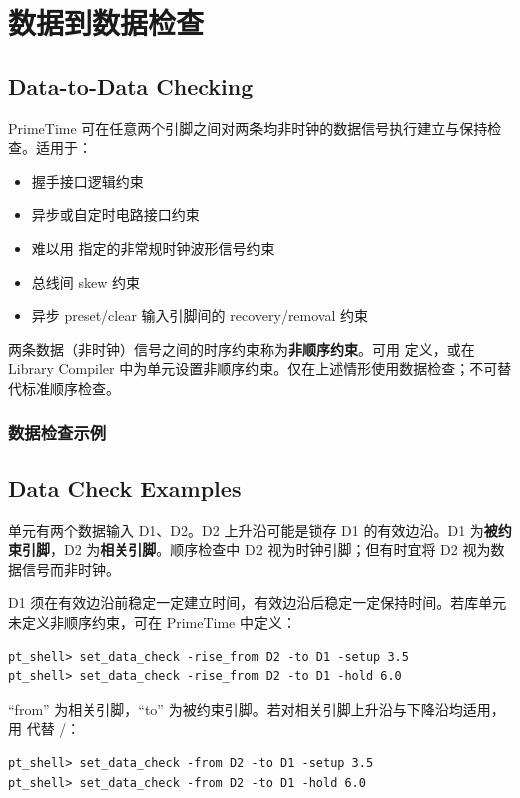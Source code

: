 \section{数据到数据检查}
\subsection*{Data-to-Data Checking}

PrimeTime 可在任意两个引脚之间对两条均非时钟的数据信号执行建立与保持检查。适用于：
\begin{itemize}
  \item 握手接口逻辑约束
  \item 异步或自定时电路接口约束
  \item 难以用  指定的非常规时钟波形信号约束
  \item 总线间 skew 约束
  \item 异步 preset/clear 输入引脚间的 recovery/removal 约束
\end{itemize}

两条数据（非时钟）信号之间的时序约束称为\textbf{非顺序约束}。可用  定义，或在 Library Compiler 中为单元设置非顺序约束。仅在上述情形使用数据检查；不可替代标准顺序检查。

\subsubsection{数据检查示例}
\subsection*{Data Check Examples}


单元有两个数据输入 D1、D2。D2 上升沿可能是锁存 D1 的有效边沿。D1 为\textbf{被约束引脚}，D2 为\textbf{相关引脚}。顺序检查中 D2 视为时钟引脚；但有时宜将 D2 视为数据信号而非时钟。

D1 须在有效边沿前稳定一定建立时间，有效边沿后稳定一定保持时间。若库单元未定义非顺序约束，可在 PrimeTime 中定义：
\begin{lstlisting}
pt_shell> set_data_check -rise_from D2 -to D1 -setup 3.5
pt_shell> set_data_check -rise_from D2 -to D1 -hold 6.0
\end{lstlisting}

“from” 为相关引脚，“to” 为被约束引脚。若对相关引脚上升沿与下降沿均适用，用  代替 /：
\begin{lstlisting}
pt_shell> set_data_check -from D2 -to D1 -setup 3.5
pt_shell> set_data_check -from D2 -to D1 -hold 6.0
\end{lstlisting}

